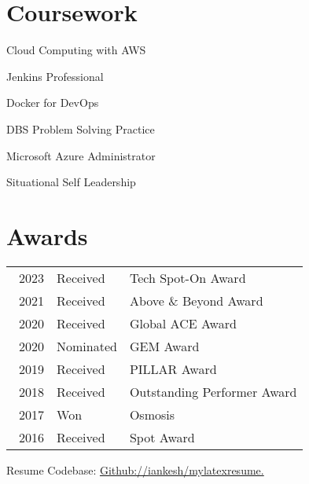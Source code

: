\documentclass[a4paper]{deedy-resume-openfont}
\begin{document}
\begin{minipage}[t]{0.49\textwidth} 
\section{Coursework}
\vspace{\topsep}
\begin{tightemize}
\item Cloud Computing with AWS 
\item Jenkins Professional
\item Docker for DevOps
\item DBS Problem Solving Practice
\item Microsoft Azure Administrator
\item Situational Self Leadership
\end{tightemize}
\sectionsep

\end{minipage} 
\hfill
\begin{minipage}[t]{0.5\textwidth} 



\section{Awards} 
\begin{tabular}{rll}\
2023	 & Received & Tech Spot-On Award \\
2021	 & Received & Above \& Beyond Award \\
2020	 & Received & Global ACE Award \\
2020	 & Nominated& GEM Award\\
2019     & Received & PILLAR Award \\
2018     & Received & Outstanding Performer Award  \\
2017     & Won      & Osmosis \\
2016     & Received & Spot Award
\end{tabular}
\sectionsep

\end{minipage} 

\center{\rule{6.5in}{0.2mm}}
\vspace{-2mm}
\center \small {Resume Codebase: {\href{https://github.com/iankesh/mylatexresume}{Github://iankesh/mylatexresume.}}}
\end{document}
